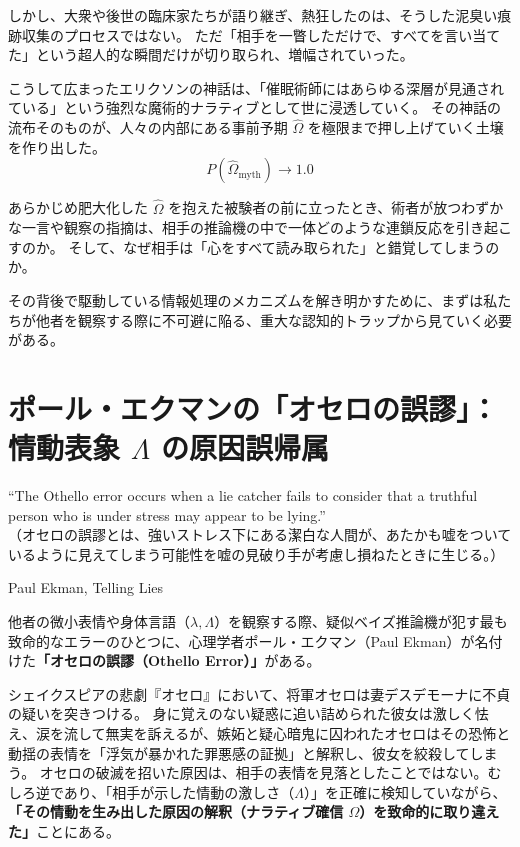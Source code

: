 しかし、大衆や後世の臨床家たちが語り継ぎ、熱狂したのは、そうした泥臭い痕跡収集のプロセスではない。
ただ「相手を一瞥しただけで、すべてを言い当てた」という超人的な瞬間だけが切り取られ、増幅されていった。

こうして広まったエリクソンの神話は、「催眠術師にはあらゆる深層が見通されている」という強烈な魔術的ナラティブとして世に浸透していく。
その神話の流布そのものが、人々の内部にある事前予期 $\hat{\Omega}$ を極限まで押し上げていく土壌を作り出した。
\begin{equation}
P(\hat{\Omega}_{\mathrm{myth}}) \longrightarrow 1.0
\end{equation}

あらかじめ肥大化した $\hat{\Omega}$ を抱えた被験者の前に立ったとき、術者が放つわずかな一言や観察の指摘は、相手の推論機の中で一体どのような連鎖反応を引き起こすのか。
そして、なぜ相手は「心をすべて読み取られた」と錯覚してしまうのか。

その背後で駆動している情報処理のメカニズムを解き明かすために、まずは私たちが他者を観察する際に不可避に陥る、重大な認知的トラップから見ていく必要がある。

\section{ポール・エクマンの「オセロの誤謬」：情動表象 $\Lambda$ の原因誤帰属}
\epigraph{``The Othello error occurs when a lie catcher fails to consider that a truthful person who is under stress may appear to be lying.''\\（オセロの誤謬とは、強いストレス下にある潔白な人間が、あたかも嘘をついているように見えてしまう可能性を嘘の見破り手が考慮し損ねたときに生じる。）}{Paul Ekman, Telling Lies}

他者の微小表情や身体言語（$\lambda, \Lambda$）を観察する際、疑似ベイズ推論機が犯す最も致命的なエラーのひとつに、心理学者ポール・エクマン（Paul Ekman）が名付けた\textbf{「オセロの誤謬（Othello Error）」}がある。

シェイクスピアの悲劇『オセロ』において、将軍オセロは妻デスデモーナに不貞の疑いを突きつける。
身に覚えのない疑惑に追い詰められた彼女は激しく怯え、涙を流して無実を訴えるが、嫉妬と疑心暗鬼に囚われたオセロはその恐怖と動揺の表情を「浮気が暴かれた罪悪感の証拠」と解釈し、彼女を絞殺してしまう。
オセロの破滅を招いた原因は、相手の表情を見落としたことではない。むしろ逆であり、「相手が示した情動の激しさ（$\Lambda$）」を正確に検知していながら、\textbf{「その情動を生み出した原因の解釈（ナラティブ確信 $\Omega$）を致命的に取り違えた」}ことにある。

